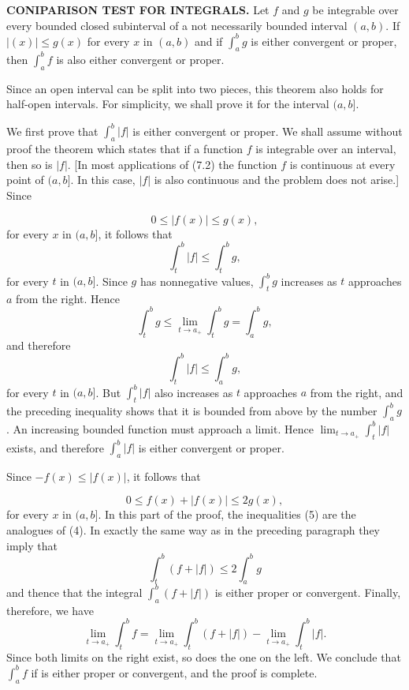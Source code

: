 \begin{theorem} %
\textbf{CONIPARISON TEST FOR INTEGRALS.}  Let $f$ and $g$ be integrable over every bounded closed subinterval of a not necessarily bounded interval $(a, b)$. If $|(x)| \leq g(x)$ for every $x$ in $(a, b)$ and if $\int_a^b g$ is either convergent or proper, then $\int_a^b f$ is also either convergent or proper.
\end{theorem}

Since an open interval can be split into two pieces, this theorem also holds for half-open intervals. For simplicity, we shall prove it for the interval $(a, b]$.


\proof We first prove that $\int_a^b |f|$ is either convergent or proper. We shall assume without proof the theorem which states that if a function $f$ is integrable over an interval, then so is $|f|$. [In most applications of (7.2) the function $f$ is continuous at every point of $(a, b]$. In this case, $|f|$ is also continuous and the problem does not arise.] Since


\begin{equation}
0 \leq |f(x)| \leq g(x),  
\label{eq8.7.4}
\end{equation}
\noindent for every $x$ in $(a, b]$, it follows that 
$$
\int_t^b |f| \leq \int_t^b g,
$$
\noindent for every $t$ in $(a, b]$. Since $g$ has nonnegative values, $\int_t^b g$ increases as $t$ approaches $a$ from the right. Hence
$$
\int_t^b g \leq \lim_{t \rightarrow a_{+}} \int_t^b g = \int_a^b g, 
$$
\noindent and therefore
$$
\int_t^b |f| \leq \int_a^b g, 
$$
\noindent for every $t$ in $(a, b]$. But $\int_t^b |f|$ also increases as $t$ approaches $a$ from the right, and the preceding inequality shows that it is bounded from above by the
number $\int_a^b g$. An increasing bounded function must approach a limit. Hence $\lim_{t \rightarrow a_{+}} \int_t^b |f|$ exists, and therefore $\int_a^b |f|$ is either convergent or proper.  

Since $-f(x) \leq |f(x)|$, it follows that 

\begin{equation}
0 \leq f(x) + | f(x) | \leq 2g(x),   
\label{eq8.7.5}
\end{equation}
\noindent for every $x$ in $(a, b]$. In this part of the proof, the inequalities (5) are the analogues of (4). In exactly the same way as in the preceding paragraph they imply that  
$$
\int_t^b (f+ |f|) \leq 2\int_a^b g
$$
\noindent and thence that the integral $\int_a^b (f + |f|)$ is either proper or convergent. Finally, therefore, we have 
$$
\lim_{t \rightarrow a_{+}} \int_t^b f = \lim_{t \rightarrow a_{+}} \int_t^b ( f +  |f| ) - \lim_{t \rightarrow a_{+}} \int_t^b |f| .
$$
\noindent Since both limits on the right exist, so does the one on the left. We conclude that $\int_a^b f$ if is either proper or convergent, and the proof is complete.

